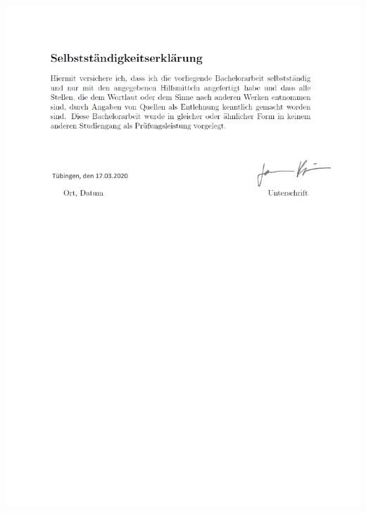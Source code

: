\documentclass[twoside,12pt,a4paper]{report}
\begin{document}
\tableofcontents

\renewcommand{\baselinestretch}{1}
\small\normalsize



\newpage
{}
\setcounter{page}{1}


\cleardoublepage

\cleardoublepage

\cleardoublepage

\cleardoublepage







\cleardoublepage

\hspace*{-4.5cm}\includegraphics[page = 1]{figures/Selbststaendigkeitserklaerung.pdf}
\end{document}

